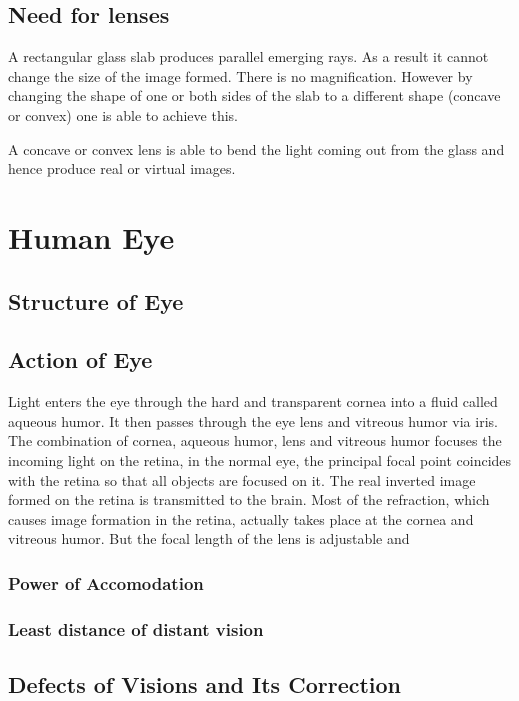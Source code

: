 \documentclass[12pt]{book}
\begin{document}
\subsection{Need for lenses}
A rectangular glass slab produces  parallel emerging rays. As a result it cannot change the size of the image formed. There is no magnification. However by changing the shape of one or both sides of the slab to a different shape (concave or convex) one is able to achieve this.

A concave or convex lens is able to bend the light coming out from the glass and hence produce real or virtual images.
\section{Human Eye}
\subsection{Structure of Eye}
\subsection{Action of Eye}
Light enters the eye through the hard and transparent cornea into a
fluid called aqueous humor. It then passes through the eye lens and
vitreous humor via iris. The combination of cornea, aqueous humor,
lens and vitreous humor focuses the incoming light on the retina,
in the normal eye, the principal focal point coincides with the retina
so that all objects are focused on it. The real inverted image formed
on the retina is transmitted to the brain. Most of the refraction, which
causes image formation in the retina, actually takes place at the cornea
and vitreous humor. But the focal length of the lens is adjustable and
\subsubsection{Power of Accomodation}
\subsubsection{Least distance of distant vision}
\subsection{Defects of Visions and Its Correction}
\end{document}
